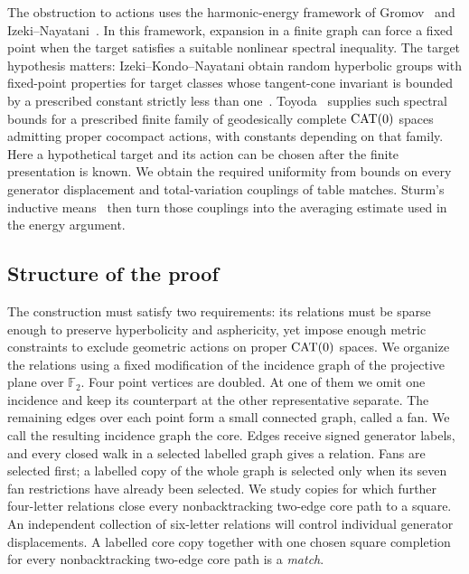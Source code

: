 The obstruction to actions uses the harmonic-energy framework of
Gromov~\cite[Sections~3.3 and~3.7]{Gromov2003} and
Izeki--Nayatani~\cite{IzekiNayatani2005}.
In this framework, expansion in a finite graph can force a fixed point
when the target satisfies a suitable nonlinear spectral inequality.
The target hypothesis matters: Izeki--Kondo--Nayatani obtain random
hyperbolic groups with fixed-point properties for target classes whose
tangent-cone invariant is bounded by a prescribed constant strictly
less than one~\cite[Corollary~3.8]{IzekiKondoNayatani2012}.
Toyoda~\cite[Theorem~1.4]{Toyoda2016} supplies such spectral bounds
for a prescribed finite family of geodesically complete $\operatorname{CAT}(0)$
spaces admitting proper cocompact actions, with constants depending
on that family.
Here a hypothetical target and its action can be chosen after the
finite presentation is known. We obtain the required uniformity from
bounds on every generator displacement and total-variation couplings
of table matches. Sturm's inductive
means~\cite[Definition~4.6 and Theorem~4.7, proof~(a)]{Sturm2003}
then turn those couplings into the averaging estimate used in the
energy argument.

\subsection{Structure of the proof}
The construction must satisfy two requirements: its relations must be sparse
enough to preserve hyperbolicity and asphericity, yet impose enough metric
constraints to exclude geometric actions on proper $\operatorname{CAT}(0)$ spaces.
We organize the relations using a fixed modification of the incidence graph
of the projective plane over $\mathbb F_2$.  Four point vertices are doubled.
At one of them we omit one incidence and keep its counterpart at the other
representative separate.  The remaining edges over each point form a small
connected graph, called a fan.  We call the resulting incidence graph
the core.  Edges receive signed generator labels,
and every closed walk in a selected labelled graph gives a relation.
Fans are selected first; a labelled copy of the whole graph is selected only
when its seven fan restrictions have already been selected.  We study
copies for which further four-letter relations close every nonbacktracking two-edge core
path to a square.  An independent collection of six-letter relations will
control individual generator displacements.  A labelled core copy together
with one chosen square completion for every nonbacktracking two-edge core path is a
\emph{match}.

